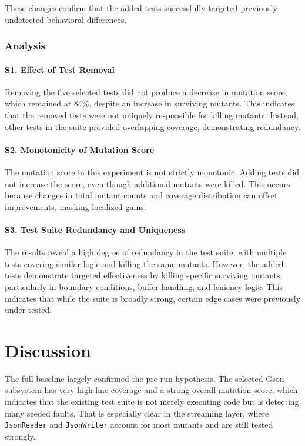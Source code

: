 \documentclass[11pt]{article}
\begin{document}
These changes confirm that the added tests successfully targeted previously undetected behavioral differences.

\subsubsection{Analysis}

\paragraph{S1. Effect of Test Removal}

Removing the five selected tests did not produce a decrease in mutation score, which remained at 84\%, despite an increase in surviving mutants. This indicates that the removed tests were not uniquely responsible for killing mutants. Instead, other tests in the suite provided overlapping coverage, demonstrating redundancy.

\paragraph{S2. Monotonicity of Mutation Score}

The mutation score in this experiment is not strictly monotonic. Adding tests did not increase the score, even though additional mutants were killed. This occurs because changes in total mutant counts and coverage distribution can offset improvements, masking localized gains.

\paragraph{S3. Test Suite Redundancy and Uniqueness}

The results reveal a high degree of redundancy in the test suite, with multiple tests covering similar logic and killing the same mutants. However, the added tests demonstrate targeted effectiveness by killing specific surviving mutants, particularly in boundary conditions, buffer handling, and leniency logic. This indicates that while the suite is broadly strong, certain edge cases were previously under-tested.

\section{Discussion}
The full baseline largely confirmed the pre-run hypothesis. The selected Gson subsystem has very high line coverage and a strong overall mutation score, which indicates that the existing test suite is not merely executing code but is detecting many seeded faults. That is especially clear in the streaming layer, where \texttt{JsonReader} and \texttt{JsonWriter} account for most mutants and are still tested strongly.
\end{document}
